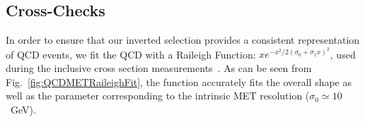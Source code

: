 \subsection{Cross-Checks}

In order to ensure that our inverted selection provides a consistent representation of
QCD events,
we fit the QCD with a Raileigh Function: $xe^{-x^2/2(\sigma_0+\sigma_1x)^2}$,
used during the inclusive cross section measurements~\cite{WZCMS:2010}.
As can be seen from Fig.~\ref{fig:QCDMETRaileighFit},
the function accurately fits the overall shape as well as the parameter
corresponding to the intrinsic MET resolution ($\sigma_0\simeq 10$~GeV).



